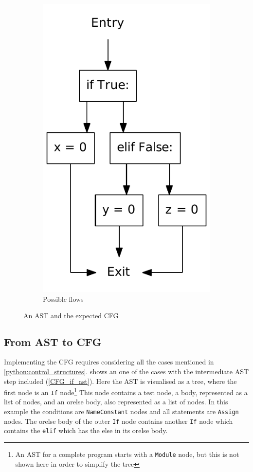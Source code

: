 \begin{figure}[H]
\begin{subfigure}[b]{0.3\textwidth}
    \includegraphics[scale=.5]{./figures/if_else_elif.pdf}
    \caption{Possible flows}
    \label{CFG_if_flow}
  \end{subfigure}

  \caption{An AST and the expected CFG}
  \label{CFG_if_else}  
\end{figure}

\subsection{From AST to CFG}
Implementing the CFG requires considering all the cases mentioned in \cref{python:control_structures}.
 shows an one of the cases with the intermediate AST step included (\cref{CFG_if_ast}).
Here the AST is visualised as a tree, where the first node is an \texttt{If} node\footnote{An AST for a complete program starts with a \texttt{Module} node, but this is not shown here in order to simplify the tree}
This node contains a test node, a body, represented as a list of nodes, and an orelse body, also represented as a list of nodes.
In this example the conditions are \texttt{NameConstant} nodes and all statements are \texttt{Assign} nodes.
The orelse body of the outer \texttt{If} node contains another \texttt{If} node which contains the \texttt{elif} which has the else in its orelse body.

